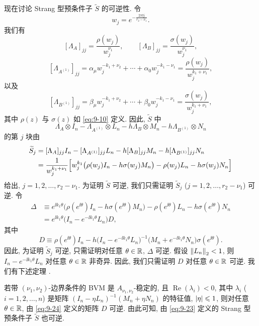 现在讨论 Strang 型预条件子 $\widetilde{S}$ 的可逆性. 令
\[
  w_j=e^{-\frac{2\pi\ii j}{r_2-\nu_1}}.
\]
我们有
\[
  [\Lambda_A]_{jj}=\frac{\rho(w_j)}{w_j^{\nu_1}},\qquad
  [\Lambda_B]_{jj}=\frac{\sigma(w_j)}{w_j^{\nu_1}},
\]
\[
  [\Lambda_{A^{(1)}}]_{jj}
  =\alpha_{\mu}w_j^{-k_1+\nu_2}+\cdots+\alpha_0w_j^{-k_1-\nu_1}
  =\frac{\rho(w_j)}{w_j^{k_1+\nu_1}},
\]
以及
\[
  [\Lambda_{B^{(1)}}]_{jj}
  =\beta_{\mu}w_j^{-k_1+\nu_2}+\cdots+\beta_0w_j^{-k_1-\nu_1}
  =\frac{\sigma(w_j)}{w_j^{k_1+\nu_1}},
\]
其中 $\rho(z)$ 与 $\sigma(z)$ 如 \eqref{eq:9-10} 定义. 因此, $\widetilde{S}$ 中
\[
  \Lambda_A\otimes I_n-\Lambda_{A^{(1)}}\otimes L_n
  -h\Lambda_B\otimes M_n-h\Lambda_{B^{(1)}}\otimes N_n
\]
的第 $j$ 块由
\[
  \begin{aligned}
    \widetilde{S}_j
    &=[\Lambda_A]_{jj}I_n-[\Lambda_{A^{(1)}}]_{jj}L_n
      -h[\Lambda_B]_{jj}M_n-h[\Lambda_{B^{(1)}}]_{jj}N_n\\
    &=\frac{1}{w_j^{k_1+\nu_1}}
      \Bigl[w_j^{k_1}\bigl(\rho(w_j)I_n-h\sigma(w_j)M_n\bigr)
      -\rho(w_j)L_n-h\sigma(w_j)N_n\Bigr]
  \end{aligned}
\]
给出, $j=1,2,\ldots,r_2-\nu_1$. 为证明 $\widetilde{S}$ 可逆, 我们只需证明 $\widetilde{S}_j$ ($j=1,2,\ldots,r_2-\nu_1$) 可逆. 令
\[
  \begin{aligned}
    \Delta&\equiv e^{\ii k_1\theta}
      \bigl(\rho(e^{\ii\theta})I_n-h\sigma(e^{\ii\theta})M_n\bigr)
      -\rho(e^{\ii\theta})L_n-h\sigma(e^{\ii\theta})N_n\\
    &=e^{\ii k_1\theta}\bigl(I_n-e^{-\ii k_1\theta}L_n\bigr)D,
  \end{aligned}
\]
其中
\begin{equation}
  D\equiv\rho(e^{\ii\theta})I_n
  -h\bigl(I_n-e^{-\ii k_1\theta}L_n\bigr)^{-1}
  \bigl(M_n+e^{-\ii k_1\theta}N_n\bigr)\sigma(e^{\ii\theta}).
  \label{eq:9-24}
\end{equation}
因此, 为证明 $\widetilde{S}_j$ 可逆, 只需证明对任意 $\theta\in\mathbb{R}$, $\Delta$ 可逆. 假设 $\left\|L_n\right\|_2<1$, 则 $I_n-e^{-\ii k_1\theta}L_n$ 对任意 $\theta\in\mathbb{R}$ 非奇异. 因此, 我们只需证明 $D$ 对任意 $\theta\in\mathbb{R}$ 可逆. 我们有下述定理 \cite{src:5}.

\begin{theorem}
\label{thm:9-5}
若带 $(\nu_1,\nu_2)$-边界条件的 BVM 是 $A_{\nu_1,\nu_2}$-稳定的, 且 $\operatorname{Re}(\lambda_i)<0$, 其中 $\lambda_i$ ($i=1,2,\ldots,n$) 是矩阵 $(I_n-\eta L_n)^{-1}(M_n+\eta N_n)$ 的特征值, $\left|\eta\right|\leqslant1$, 则对任意 $\theta\in\mathbb{R}$, 由 \eqref{eq:9-24} 定义的矩阵 $D$ 可逆. 由此可知, 由 \eqref{eq:9-23} 定义的 Strang 型预条件子 $\widetilde{S}$ 也可逆.
\end{theorem}

